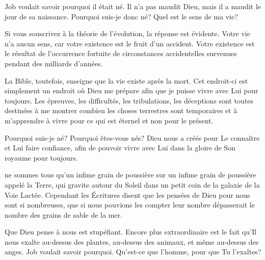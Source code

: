 Job voulait savoir pourquoi il était né. Il n'a pas maudit Dieu,
 mais il a maudit le jour de sa naissance.
 \og Pourquoi suis-je donc né? Quel est le sens de ma vie? \fg{}

Si vous souscrivez à la théorie de l'évolution, la réponse est évidente.
 Votre vie n'a aucun sens, car votre existence est le fruit d'un accident.
 Votre existence est le résultat de l'occurrence fortuite
 de circonstances accidentelles survenues pendant des milliards d'années.

La Bible, toutefois, enseigne que la vie existe après la mort.
 Cet endroit-ci est simplement un endroit où Dieu me prépare
 afin que je puisse vivre avec Lui pour toujours.
 Les épreuves, les difficultés, les tribulations,
 les déceptions sont toutes destinées à me montrer
 combien les choses terrestres sont temporaires
 et à m'apprendre à vivre pour ce qui est éternel et non pour le présent.

Pourquoi suis-je né? Pourquoi êtes-vous nés?
 Dieu nous a créés pour Le connaître et Lui faire confiance,
 afin de pouvoir vivre avec Lui dans la gloire de Son royaume pour toujours. 

\dvrule







 ne sommes tous qu'un infime grain de poussière
 sur un infime grain de poussière appelé la Terre,
 qui gravite autour du Soleil dans un petit coin de la galaxie
 de la Voie Lactée.
 Cependant les Écritures disent que les pensées de Dieu pour nous
 sont si nombreuses, que si nous pouvions les compter
 leur nombre dépasserait le nombre des grains de sable de la mer.

Que Dieu pense à nous est stupéfiant. Encore plus extraordinaire
 est le fait qu'Il nous exalte \ocadr{}au-dessus des plantes,
 au-dessus des animaux, et même au-dessus des anges.
 Job voulait savoir pourquoi.
 \og Qu'est-ce que l'homme, pour que Tu l'exaltes? \fg{}

